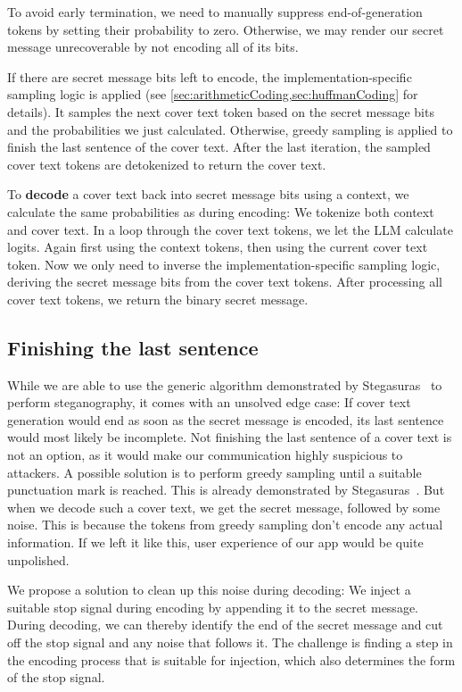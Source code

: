 To avoid early termination, we need to manually suppress end-of-generation tokens by setting their probability to zero. Otherwise, we may render our secret message unrecoverable by not encoding all of its bits.

If there are secret message bits left to encode, the implementation-specific sampling logic is applied (see \cref{sec:arithmeticCoding,sec:huffmanCoding} for details). It samples the next cover text token based on the secret message bits and the probabilities we just calculated. Otherwise, greedy sampling is applied to finish the last sentence of the cover text. After the last iteration, the sampled cover text tokens are detokenized to return the cover text.

To \textbf{decode} a cover text back into secret message bits using a context, we calculate the same probabilities as during encoding: We tokenize both context and cover text. In a loop through the cover text tokens, we let the \gls{LLM} calculate logits. Again first using the context tokens, then using the current cover text token. Now we only need to inverse the implementation-specific sampling logic, deriving the secret message bits from the cover text tokens. After processing all cover text tokens, we return the binary secret message.

\subsection{Finishing the last sentence}
\label{sec:finishingTheLastSentence}
While we are able to use the generic algorithm demonstrated by Stegasuras~\cite{zieglerNeuralLinguisticSteganography2019} to perform steganography, it comes with an unsolved edge case: If cover text generation would end as soon as the secret message is encoded, its last sentence would most likely be incomplete. Not finishing the last sentence of a cover text is not an option, as it would make our communication highly suspicious to attackers. A possible solution is to perform greedy sampling until a suitable punctuation mark is reached. This is already demonstrated by Stegasuras~\cite{zieglerHarvardnlpNeuralSteganography2025}. But when we decode such a cover text, we get the secret message, followed by some noise. This is because the tokens from greedy sampling don't encode any actual information. If we left it like this, user experience of our app would be quite unpolished.

We propose a solution to clean up this noise during decoding: We inject a suitable stop signal during encoding by appending it to the secret message. During decoding, we can thereby identify the end of the secret message and cut off the stop signal and any noise that follows it. The challenge is finding a step in the encoding process that is suitable for injection, which also determines the form of the stop signal.

